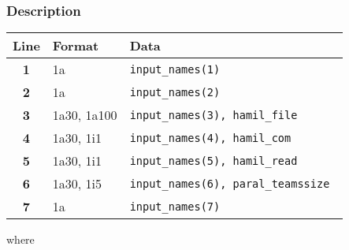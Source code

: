 \documentclass[a4paper,11pt]{article}
\begin{document}
\subsubsection*{Description}
\begin{center}
\begin{tabular}{|c|l|l|}
\hline
Line & Format & Data \\
\hline
 \textbf{1}   & 1a             & \tt input\_names(1)                   \\
 \textbf{2}   & 1a             & \tt input\_names(2)                   \\
 \textbf{3}   & 1a30, 1a100    & \tt input\_names(3), hamil\_file      \\
 \textbf{4}   & 1a30, 1i1      & \tt input\_names(4), hamil\_com       \\
 \textbf{5}   & 1a30, 1i1      & \tt input\_names(5), hamil\_read      \\
 \textbf{6}   & 1a30, 1i5      & \tt input\_names(6), paral\_teamssize \\
 \textbf{7}   & 1a             & \tt input\_names(7)                   \\
\hline
\end{tabular}
\end{center}
where 
\end{document}
